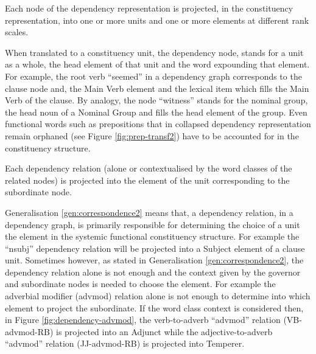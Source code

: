     \begin{generalization}\label{gen:correspondence1} %
     Each node of the dependency representation is projected, in the constituency representation, into one or more units and one or more elements at different rank scales.
    \end{generalization}

    When translated to a constituency unit, the dependency node, stands for a unit as a whole, the head element of that unit and the word expounding that element. For example, the root verb ``seemed'' in a dependency graph corresponds to the clause node and, the Main Verb element and the lexical item which fills the Main Verb of the clause. By analogy, the node ``witness'' stands for the nominal group, the head noun of a Nominal Group and fills the head element of the group. Even functional words such as prepositions that in collapsed dependency representation remain orphaned (see Figure \ref{fig:prep-transf2}) have to be accounted for in the constituency structure. 

    \begin{generalization}\label{gen:correspondence2}
        Each dependency relation (alone or contextualised by the word classes of the related nodes) is projected into the element of the unit corresponding to the subordinate node. 
    \end{generalization}

    Generalisation \ref{gen:correspondence2} means that, a dependency relation, in a dependency graph, is primarily responsible for determining the choice of a unit the element in the systemic functional constituency structure. For example the ``nsubj'' dependency relation will be projected into a Subject element of a clause unit. Sometimes however, as stated in Generalisation \ref{gen:correspondence2}, the dependency relation alone is not enough and the context given by the governor and subordinate nodes is needed to choose the element. For example the adverbial modifier (advmod) relation alone is not enough to determine into which element to project the subordinate. If the word class context is considered then, in Figure \ref{fig:dependency-advmod}, the verb-to-adverb ``advmod'' relation (VB-advmod-RB) is projected into an Adjunct while the adjective-to-adverb ``advmod'' relation (JJ-advmod-RB) is projected into Temperer.

